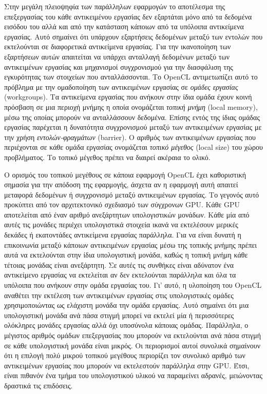 Στην μεγάλη πλειοψηφία των παράλληλων εφαρμογών το αποτέλεσμα της επεξεργασίας του κάθε αντικειμένου εργασίας δεν εξαρτάται μόνο από τα δεδομένα εισόδου του αλλά και από την κατάσταση κάποιων από τα υπόλοιπα αντικείμενα εργασίας. Αυτό σημαίνει ότι υπάρχουν εξαρτήσεις δεδομένων μεταξύ των εντολών που εκτελούνται σε διαφορετικά αντικείμενα εργασίας. Για την ικανοποίηση των εξαρτήσεων αυτών απαιτείται να υπάρχει ανταλλαγή δεδομένων μεταξύ των αντικειμένων εργασίας και μηχανισμοί συγχρονισμού για την διασφάλιση της εγκυρότητας των στοιχείων που ανταλλάσσονται. Το OpenCL αντιμετωπίζει αυτό το πρόβλημα με την ομαδοποίηση των αντικειμένων εργασίας σε \textit{ομάδες εργασίας} (workgroups). Τα αντικείμενα εργασίας που ανήκουν στην ίδια ομάδα έχουν κοινή πρόσβαση σε μια περιοχή μνήμης η οποία ονομάζεται \textit{τοπική μνήμη} (local memory), μέσω της οποίας μπορούν να ανταλλάσσουν δεδομένα. Επίσης εντός της ίδιας ομάδας εργασίας παρέχεται η δυνατότητα συγχρονισμού μεταξύ των αντικειμένων εργασίας με την χρήση \textit{
εντολών-φραγμάτων} (barrier). Ο αριθμός των αντικειμένων εργασίας που περιέχονται σε κάθε ομάδα εργασίας ονομάζεται \textit{τοπικό μέγεθος} (local size) του χώρου προβλήματος. Το τοπικό μέγεθος πρέπει να διαιρεί ακέραια το ολικό.

Ο ορισμός του τοπικού μεγέθους σε κάποια εφαρμογή OpenCL έχει καθοριστική σημασία για την απόδοση της εφαρμογής, άσχετα αν η εφαρμογή αυτή απαιτεί μεταφορά δεδομένων ή συγχρονισμό μεταξύ αντικειμένων εργασίας. Το γεγονός αυτό προκύπτει από τον αρχιτεκτονικό σχεδιασμό των σύγχρονων GPU. Κάθε GPU αποτελείται από έναν αριθμό ανεξάρτητων υπολογιστικών μονάδων. Κάθε μία από αυτές τις μονάδες περιέχει υπολογιστικά στοιχεία ικανά να εκτελέσουν μερικές δεκάδες ή εκατοντάδες αντικείμενα εργασίας παράλληλα. Για να είναι δυνατή η επικοινωνία μεταξύ κάποιων αντικειμένων εργασίας μέσω της τοπικής μνήμης πρέπει αυτά να εκτελούνται στην ίδια υπολογιστική μονάδα, καθώς η τοπική μνήμη κάθε τέτοιας μονάδας είναι ανεξάρτητη. Σε αυτές τις συνθήκες είναι αδύνατον ένα αντικείμενο εργασίας να εκτελείται αν δεν εκτελούνται παράλληλα και όλα τα υπόλοιπα που ανήκουν στην ομάδα εργασίας του. Γι' αυτό, η υλοποίηση του OpenCL αναθέτει την εκτέλεση των αντικειμένων εργασίας στις υπολογιστικές ομάδες χρησιμοποιώντας ως ελάχιστη μονάδα την 
ομάδα εργασίας. Αυτό σημαίνει ότι μια υπολογιστική μονάδα ανά πάσα στιγμή μπορεί να εκτελεί μία ή περισσότερες ολόκληρες μονάδες εργασίας αλλά όχι υποσύνολα κάποιας ομάδας.  Παράλληλα, ο μέγιστος αριθμός ομάδων επεξεργασίας που μπορούν να εκτελούνται ανά πάσα στιγμή σε κάθε υπολογιστική μονάδα είναι μικρός. Οι περιορισμοί αυτοί συνολικά σημαίνουν ότι η επιλογή πολύ μικρού τοπικού μεγέθους περιορίζει τον συνολικό αριθμό των αντικειμένων εργασίας που μπορούν να εκτελεστούν παράλληλα στην GPU. Έτσι, είναι πιθανόν ένα τμήμα του υπολογιστικού υλικού να παραμείνει αδρανές, μειώνοντας δραστικά τις επιδόσεις.

